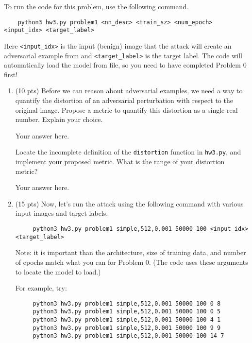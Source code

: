 To run the code for this problem, use the following command.
%
\begin{Verbatim}
	python3 hw3.py problem1 <nn_desc> <train_sz> <num_epoch> <input_idx> <target_label>
\end{Verbatim}
%
Here \texttt{<input\_idx>} is the input (benign) image that the attack will create an adversarial example from and \texttt{<target\_label>} is the target label. The code will automatically load the model from file, so you need to have completed Problem 0 first!

%
\begin{enumerate}
%
	\item (10 pts) Before we can reason about adversarial examples, we need a way to quantify the distortion of an adversarial perturbation with respect to the original image. Propose a metric to quantify this distortion as a single real number. Explain your choice.
	
	\begin{answer}
	
		Your answer here.
		
	\end{answer}
		
	
	\medskip \noindent Locate the incomplete definition of the \texttt{distortion} function in \texttt{hw3.py}, and implement your proposed metric. What is the range of your distortion metric?
	
	\begin{answer}
	
		Your answer here.
		
	\end{answer}

	\item (15 pts) Now, let's run the attack using the following command with various input images and target labels.
	\begin{Verbatim}
     python3 hw3.py problem1 simple,512,0.001 50000 100 <input_idx> <target_label>
	\end{Verbatim}	
	Note: it is important than the architecture, size of training data, and number of epochs match what you ran for Problem 0. (The code uses these arguments to locate the model to load.)
	
	For example, try:
	\begin{Verbatim}
     python3 hw3.py problem1 simple,512,0.001 50000 100 0 8
     python3 hw3.py problem1 simple,512,0.001 50000 100 0 5
     python3 hw3.py problem1 simple,512,0.001 50000 100 4 1
     python3 hw3.py problem1 simple,512,0.001 50000 100 9 9
     python3 hw3.py problem1 simple,512,0.001 50000 100 14 7
	\end{Verbatim}	
	

\end{enumerate}
